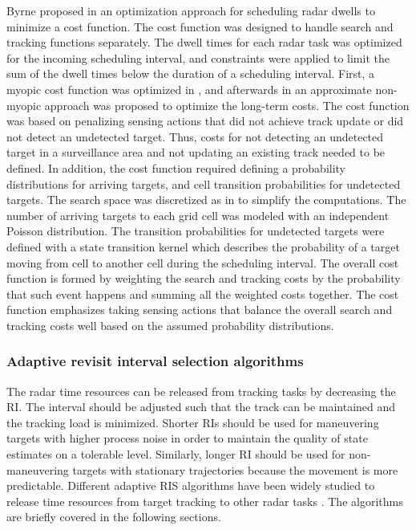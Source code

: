\documentclass[english, 12pt, a4paper, elec, utf8, a-1b, online]{aaltothesis}
\begin{document}
Byrne proposed in \cite{Byrne2015, Byrne2016} an optimization approach for scheduling radar dwells to minimize a cost function. 
The cost function was designed to handle search and tracking functions separately.
The dwell times for each radar task was optimized for the incoming scheduling interval, and constraints were applied to limit the sum of the dwell times below the duration of a scheduling interval.
First, a myopic cost function was optimized in \cite{Byrne2015}, and afterwards in \cite{Byrne2016} an approximate non-myopic approach was proposed to optimize the long-term costs.
The cost function was based on penalizing sensing actions that did not achieve track update or did not detect an undetected target.
Thus, costs for not detecting an undetected target in a surveillance area and not updating an existing track needed to be defined.
In addition, the cost function required defining a probability distributions for arriving targets, and cell transition probabilities for undetected targets.
The search space was discretized as in \cite{Kreucher2004} to simplify the computations.
The number of arriving targets to each grid cell was modeled with an independent Poisson distribution.
The transition probabilities for undetected targets were defined with a state transition kernel which describes the probability of a target moving from cell to another cell during the scheduling interval.
The overall cost function is formed by weighting the search and tracking costs by the probability that such event happens and summing all the weighted costs together.
The cost function emphasizes taking sensing actions that balance the overall search and tracking costs well based on the assumed probability distributions.

\subsubsection{Adaptive revisit interval selection algorithms} \label{sec:tbm_ri}

The radar time resources can be released from tracking tasks by decreasing the RI. 
The interval should be adjusted such that the track can be maintained and the tracking load is minimized.
Shorter RIs should be used for maneuvering targets with higher process noise in order to maintain the quality of state estimates on a tolerable level. 
Similarly, longer RI should be used for non-maneuvering targets with stationary trajectories because the movement is more predictable.
Different adaptive RIS algorithms have been widely studied to release time resources from target tracking to other radar tasks \cite{Cohen1986, Gardner1988, Munu1992, ChengTing2007, Baek2010, Watson1993, Charlish2015, Keuk1975, Shin1995, Benoudnine2006, Esfahani2012, Zamani2017, Christiansen2018, Pilte2018}.
The algorithms are briefly covered in the following sections. 
\end{document}
